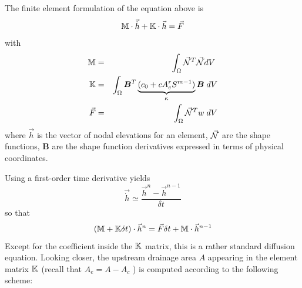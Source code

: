 The finite element formulation of the equation above is 
\[
{\mathbb{M}} \cdot \vec{\dot h} + {\mathbb{K}} \cdot \vec{h} = \vec{F} 
\]
with 
\begin{eqnarray}
{\mathbb{M}} &=& \int_\Omega \vec{{\mathcal{N}}}^T \vec{{\mathcal{N}}} dV \; \nonumber\\
{\mathbb{K}} &=& \int_\Omega {\bm B}^T \underbrace{(c_0 + c A_e^r S^{m-1})}_{\kappa}  {\bm B} \;  dV \nonumber\\
\vec{F} &=& \int_\Omega  \vec{{\mathcal{N}}}^T w \; dV
\end{eqnarray}
where $\vec{h}$ is the vector of nodal elevations for an element, $\vec{{\mathcal{N}}}$ 
are the shape functions, ${\bm B}$ are the shape function derivatives expressed 
in terms of physical coordinates.

Using a first-order time derivative yields
\[
\vec{\dot h} \simeq \frac{\vec{h}^n-\vec{h}^{n-1}}{\delta t}
\]
so that 
\[
({\mathbb{M}}  + {\mathbb{K}} \delta t ) \cdot \vec{h}^n = \vec{F} \delta t  + {\mathbb{M}} \cdot \vec{h}^{n-1}
\]
Except for the coefficient inside the ${\mathbb{K}}$ matrix, this is a rather standard diffusion equation. 
Looking closer, the upstream drainage area $A$ appearing in the element matrix ${\mathbb{K}}$ 
(recall that $A_e = A - A_c$ ) is computed according to the following scheme:
